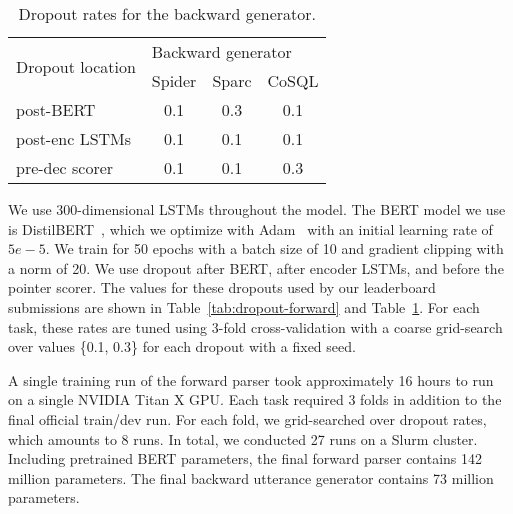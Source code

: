 \documentclass[11pt,a4paper]{article}
\begin{document}
\begin{table}[ht]
\centering
\begin{tabular}{@{}lccc@{}}
\toprule
\multirow{2}{*}{Dropout location} & \multicolumn{3}{l}{Backward generator} \\ \cmidrule(l){2-4} 
                                  & Spider     & Sparc     & CoSQL     \\ \midrule
post-BERT                     & 0.1        & 0.3       & 0.1       \\
post-enc LSTMs                & 0.1        & 0.1       & 0.1       \\
pre-dec scorer                & 0.1        & 0.1       & 0.3       \\ \bottomrule
\end{tabular}
\caption{Dropout rates for the backward generator.}
\label{tab:dropout-backward}
\end{table}


We use 300-dimensional LSTMs throughout the model.
The BERT model we use is DistilBERT~\citep{sanh2019distilbert}, which we optimize with Adam~\citep{Kingma2014AdamAM} with an initial learning rate of $5e-5$.
We train for 50 epochs with a batch size of 10 and gradient clipping with a norm of 20.
We use dropout after BERT, after encoder LSTMs, and before the pointer scorer.
The values for these dropouts used by our leaderboard submissions are shown in Table~\ref{tab:dropout-forward} and Table~\ref{tab:dropout-backward}.
For each task, these rates are tuned using 3-fold cross-validation with a coarse grid-search over values \{0.1, 0.3\} for each dropout with a fixed seed.


A single training run of the forward parser took approximately 16 hours to run on a single NVIDIA Titan X GPU.
Each task required 3 folds in addition to the final official train/dev run.
For each fold, we grid-searched over dropout rates, which amounts to 8 runs.
In total, we conducted 27 runs on a Slurm cluster.
Including pretrained BERT parameters, the final forward parser contains 142 million parameters.
The final backward utterance generator contains 73 million parameters.
\end{document}
